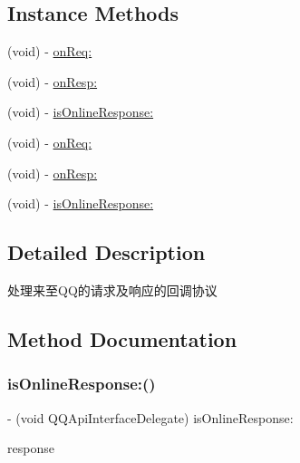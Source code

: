 \subsection*{Instance Methods}
\begin{DoxyCompactItemize}
\item 
(void) -\/ \mbox{\hyperlink{protocol_q_q_api_interface_delegate_01-p_a3fea44120101ae14ee97187ab622068b}{on\+Req\+:}}
\item 
(void) -\/ \mbox{\hyperlink{protocol_q_q_api_interface_delegate_01-p_a8be1b388f41e1031e1a7a8051ef96315}{on\+Resp\+:}}
\item 
(void) -\/ \mbox{\hyperlink{protocol_q_q_api_interface_delegate_01-p_ae5caa86d8c58fdc5c861a335276b88e4}{is\+Online\+Response\+:}}
\item 
(void) -\/ \mbox{\hyperlink{protocol_q_q_api_interface_delegate_01-p_a3fea44120101ae14ee97187ab622068b}{on\+Req\+:}}
\item 
(void) -\/ \mbox{\hyperlink{protocol_q_q_api_interface_delegate_01-p_a8be1b388f41e1031e1a7a8051ef96315}{on\+Resp\+:}}
\item 
(void) -\/ \mbox{\hyperlink{protocol_q_q_api_interface_delegate_01-p_ae5caa86d8c58fdc5c861a335276b88e4}{is\+Online\+Response\+:}}
\end{DoxyCompactItemize}


\subsection{Detailed Description}
处理来至\+Q\+Q的请求及响应的回调协议 

\subsection{Method Documentation}
\mbox{\label{protocol_q_q_api_interface_delegate_01-p_ae5caa86d8c58fdc5c861a335276b88e4}} 
\subsubsection{\texorpdfstring{is\+Online\+Response\+:()}{isOnlineResponse:()}\hspace{0.1cm}{\footnotesize\ttfamily [1/2]}}
{\footnotesize\ttfamily -\/ (void Q\+Q\+Api\+Interface\+Delegate) is\+Online\+Response\+: \begin{DoxyParamCaption}\item[{(N\+S\+Dictionary $\ast$)}]{response }\end{DoxyParamCaption}}

